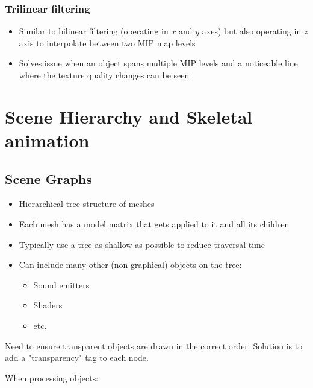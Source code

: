 \documentclass[a4paper]{article}
\begin{document}
\subsubsection{Trilinear filtering}

\begin{itemize}
  \item
    Similar to bilinear filtering (operating in $x$ and $y$ axes) but also
    operating in $z$ axis to interpolate between two MIP map levels

  \item
    Solves issue when an object spans multiple MIP levels and a noticeable line
    where the texture quality changes can be seen

\end{itemize}

\section{Scene Hierarchy and Skeletal animation}

\subsection{Scene Graphs}

\begin{itemize}
  \item
    Hierarchical tree structure of meshes

  \item
    Each mesh has a model matrix that gets applied to it and all its children

  \item
    Typically use a tree as shallow as possible to reduce traversal time

  \item
    Can include many other (non graphical) objects on the tree:

    \begin{itemize}
      \item Sound emitters
      \item Shaders
      \item etc.
    \end{itemize}

\end{itemize}

Need to ensure transparent objects are drawn in the correct order. Solution is
to add a "transparency" tag to each node.

When processing objects:
\end{document}
